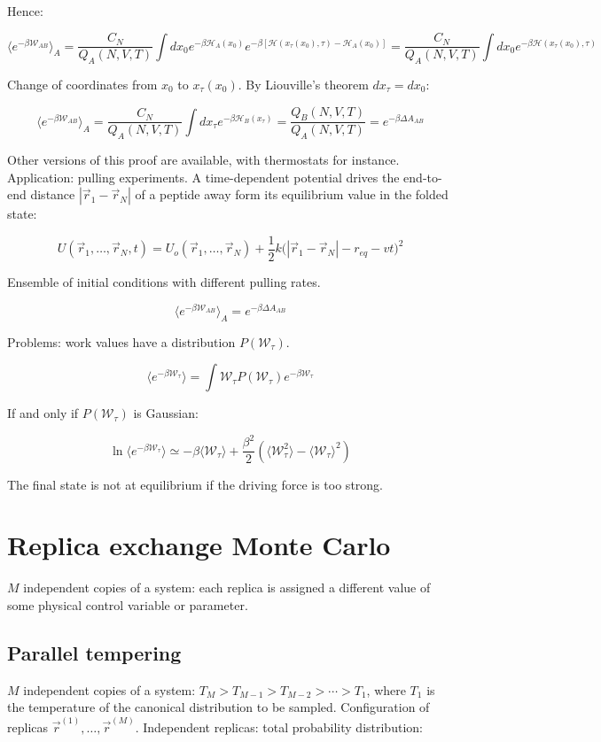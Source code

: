 Hence:

$$\langle e^{-\beta\mathcal{W}_{AB}}\rangle_A = \frac{C_N}{Q_A(N, V, T)}\int dx_0e^{-\beta\mathcal{H}_A(x_0)}e^{-\beta[\mathcal{H}(x_\tau(x_0), \tau)-\mathcal{H}_A(x_0)]} = \frac{C_N}{Q_A(N, V, T)}\int dx_0e^{-\beta\mathcal{H}(x_\tau(x_0), \tau)}$$

Change of coordinates from $x_0$  to $x_\tau(x_0)$.
By Liouville's theorem $dx_\tau = dx_0$:

$$\langle e^{-\beta\mathcal{W}_{AB}}\rangle_A = \frac{C_N}{Q_A(N, V, T)}\int dx_\tau e^{-\beta\mathcal{H}_B(x_\tau)} = \frac{Q_B(N, V, T)}{Q_A(N, V, T)} = e^{-\beta\Delta A_{AB}}$$

Other versions of this proof are available, with thermostats for instance.
Application: pulling experiments.
A time-dependent potential drives the end-to-end distance $|\vec{r}_1-\vec{r}_N|$ of a peptide away form its equilibrium value in the folded state:

$$U(\vec{r}_1, \dots, \vec{r}_N, t) = U_o(\vec{r}_1, \dots, \vec{r}_N) + \frac{1}{2}k\bigl(|\vec{r}_1-\vec{r}_N|-r_{eq}-vt\bigr)^2$$

Ensemble of initial conditions with different pulling rates.

$$\langle e^{-\beta\mathcal{W}_{AB}}\rangle_A = e^{-\beta\Delta A_{AB}}$$

Problems: work values have a distribution $P(\mathcal{W}_\tau)$.

$$\langle e^{-\beta\mathcal{W}_\tau}\rangle= \int\mathcal{W}_\tau P(\mathcal{W}_\tau)e^{-\beta\mathcal{W}_\tau}$$

If and only if $P(\mathcal{W}_\tau)$ is Gaussian:

$$\ln\langle e^{-\beta\mathcal{W}_\tau}\rangle\simeq-\beta\langle\mathcal{W}_\tau\rangle + \frac{\beta^2}{2}(\langle\mathcal{W}_\tau^2\rangle-\langle\mathcal{W}_\tau\rangle^2)$$

The final state is not at equilibrium if the driving force is too strong.

\section{Replica exchange Monte Carlo}
$M$ independent copies of a system: each replica is assigned a different value of some physical control variable or parameter.

	\subsection{Parallel tempering}
	$M$ independent copies of a system: $T_M>T_{M-1}>T_{M-2}>\cdots>T_1$, where $T_1$ is the temperature of the canonical distribution to be sampled.
	Configuration of replicas $\vec{r}^{(1)}, \dots, \vec{r}^{(M)}$.
	Independent replicas: total probability distribution:

